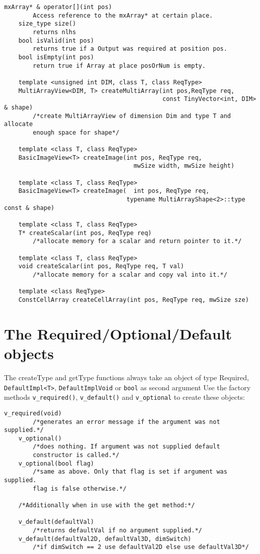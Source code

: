 \documentclass[a4paper,10pt]{article}
\begin{document}
\begin{lstlisting}[caption={matlab::OutputArray}]
	mxArray* & operator[](int pos)
		Access reference to the mxArray* at certain place.
	size_type size()
		returns nlhs
	bool isValid(int pos)
		returns true if a Output was required at position pos.
	bool isEmpty(int pos)
		return true if Array at place posOrNum is empty.	

	template <unsigned int DIM, class T, class ReqType>
	MultiArrayView<DIM, T> createMultiArray(int pos,ReqType req,
                                            const TinyVector<int, DIM>  & shape)
		/*create MultiArrayView of dimension Dim and type T and allocate 
		enough space for shape*/

	template <class T, class ReqType>
	BasicImageView<T> createImage(int pos, ReqType req,
                                    mwSize width, mwSize height)

	template <class T, class ReqType>
	BasicImageView<T> createImage(  int pos, ReqType req,
                                  typename MultiArrayShape<2>::type const & shape)

	template <class T, class ReqType>
	T* createScalar(int pos, ReqType req)
		/*allocate memory for a scalar and return pointer to it.*/

	template <class T, class ReqType>
	void createScalar(int pos, ReqType req, T val)
		/*allocate memory for a scalar and copy val into it.*/

	template <class ReqType>
	ConstCellArray createCellArray(int pos, ReqType req, mwSize sze)
\end{lstlisting}

\section{The Required/Optional/Default objects}
The createType and getType functions always take an object of type Required, 
\verb+DefaultImpl<T>+,  \verb+DefaultImplVoid+ or \verb+bool+ as second argument 
Use the factory methods \verb+v_required()+, \verb+v_default()+ and 
\verb+v_optional+ to create these objects:

\begin{lstlisting}[caption={Behavior of the get/set functions with the factory objects}]
	v_required(void)
		/*generates an error message if the argument was not supplied.*/
	v_optional()
		/*does nothing. If argument was not supplied default 
		constructor is called.*/
	v_optional(bool flag)
		/*same as above. Only that flag is set if argument was supplied. 
		flag is false otherwise.*/
	
	/*Additionally when in use with the get method:*/
	
	v_default(defaultVal)
		/*returns defaultVal if no argument supplied.*/
	v_default(defaultVal2D, defaultVal3D, dimSwitch)
		/*if dimSwitch == 2 use defaultVal2D else use defaultVal3D*/
\end{lstlisting}
\end{document}

